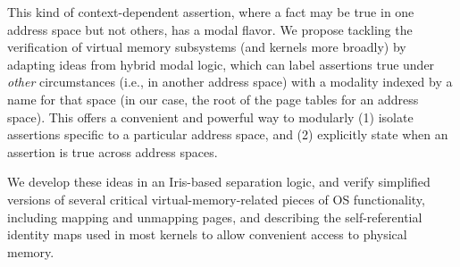 This kind of context-dependent assertion, where a fact may be true in one address space but not others, has a modal flavor. We propose tackling the verification of virtual memory subsystems (and kernels more broadly) by adapting ideas from hybrid modal logic, which can label assertions true under \emph{other} circumstances (i.e., in another address space) with a modality indexed by a name for that space (in our case, the root of the page tables for an address space). This offers a convenient and powerful way to modularly (1) isolate assertions specific to a particular address space, and (2) explicitly state when an assertion is true across address spaces.

We develop these ideas in an Iris-based separation logic, and verify simplified versions of several critical virtual-memory-related pieces of OS functionality, including mapping and unmapping pages, and describing the self-referential identity maps used in most kernels to allow convenient access to physical memory.